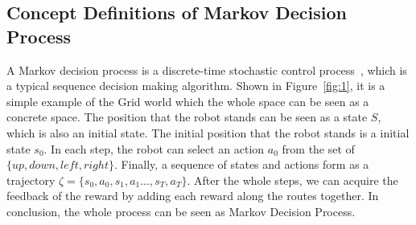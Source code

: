 \documentclass[11pt]{article}
\begin{document}

\subsection{Concept Definitions of Markov Decision Process}
A Markov decision process is a discrete-time stochastic control process~\cite{puterman1990markov}, which is a typical sequence decision making algorithm. Shown in Figure~\ref{fig:1}, it is a simple example of the Grid world which the whole space can be seen as a concrete space. The position that the robot stands can be seen as a state $S$, which is also an initial state. The initial position that the robot stands is a initial state $s_0$. In each step, the robot can select an action $a_0$ from the set of $\{up, down, left, right\}$. Finally, a sequence of states and actions form as a trajectory $\zeta = \{ s_0, a_0, s_1, a_1 \dots, s_T, a_T \}$. After the whole steps, we can acquire the feedback of the reward by adding each reward along the routes together. In conclusion, the whole process can be seen as Markov Decision Process.

\end{document}
